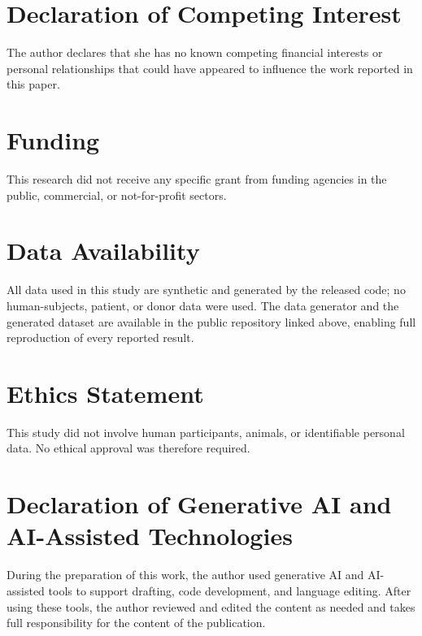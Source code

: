 \documentclass[journal]{IEEEtran}
\begin{document}
\section*{Declaration of Competing Interest}
The author declares that she has no known competing financial interests or
personal relationships that could have appeared to influence the work reported in
this paper.

\section*{Funding}
This research did not receive any specific grant from funding agencies in the
public, commercial, or not-for-profit sectors.

\section*{Data Availability}
All data used in this study are synthetic and generated by the released code; no
human-subjects, patient, or donor data were used. The data generator and the
generated dataset are available in the public repository linked above, enabling
full reproduction of every reported result.

\section*{Ethics Statement}
This study did not involve human participants, animals, or identifiable personal
data. No ethical approval was therefore required.

\section*{Declaration of Generative AI and AI-Assisted Technologies}
During the preparation of this work, the author used generative AI and
AI-assisted tools to support drafting, code development, and language editing.
After using these tools, the author reviewed and edited the content as needed and
takes full responsibility for the content of the publication.
\end{document}
